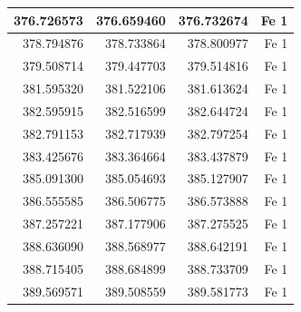 \documentclass[12pt,oneside,openany,letter]{book}
\begin{document}
\begin{longtable}{|r|r|r|r|}
376.726573                                & 376.659460                               & 376.732674                              & Fe 1                               \\ \hline
378.794876                                & 378.733864                               & 378.800977                              & Fe 1                               \\ \hline
379.508714                                & 379.447703                               & 379.514816                              & Fe 1                               \\ \hline
381.595320                                & 381.522106                               & 381.613624                              & Fe 1                               \\ \hline
382.595915                                & 382.516599                               & 382.644724                              & Fe 1                               \\ \hline
382.791153                                & 382.717939                               & 382.797254                              & Fe 1                               \\ \hline
383.425676                                & 383.364664                               & 383.437879                              & Fe 1                               \\ \hline
385.091300                                & 385.054693                               & 385.127907                              & Fe 1                               \\ \hline
386.555585                                & 386.506775                               & 386.573888                              & Fe 1                               \\ \hline
387.257221                                & 387.177906                               & 387.275525                              & Fe 1                               \\ \hline
388.636090                                & 388.568977                               & 388.642191                              & Fe 1                               \\ \hline
388.715405                                & 388.684899                               & 388.733709                              & Fe 1                               \\ \hline
389.569571                                & 389.508559                               & 389.581773                              & Fe 1                               \\ \hline

\end{longtable}
\end{document}
